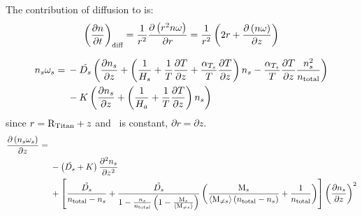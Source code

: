 The contribution of diffusion to  is:
\begin{equation}
\left(\frac{\partial n}{\partial t}\right)_{\text{diff}} = \frac{1}{r^2}\frac{\partial\left(r^2n\omega\right)}{\partial r}
                                             = \frac{1}{r^2}\left(2 r + \frac{\partial\left(n\omega\right)}{\partial z}\right)
\label{Titan:diffusion}
\end{equation}

\begin{equation}
\begin{split}
n_s\omega_s = &\: -\tilde{D_s} 
                        \left(\frac{\partial n_s}{\partial z} + \left(\frac{1}{H_s} + 
                                \frac{1}{T}\frac{\partial T}{\partial z} + \frac{\alpha_{T_s}}{T}\frac{\partial T}{\partial z}\right)n_s
                                - \frac{\alpha_{T_s}}{T}\frac{\partial T}{\partial z}\frac{n_s^2}{n_\text{total}}\right) \\
                  &\: - K \left(\frac{\partial n_s}{\partial z} + \left(\frac{1}{H_a} + \frac{1}{T}\frac{\partial T}{\partial z}\right)n_s\right)
\end{split}
\end{equation}
since $r = \text{R}_\text{Titan} + z$ and \RTitan\ is constant, $\partial r = \partial z$.
\begin{equation}
\begin{split}
\frac{\partial\left(n_s\omega_s\right)}{\partial z} = &\; \\
        &\; - \left(\tilde{D_s} + K\right) \frac{\partial^2n_s}{\partial{z}^2} \\
        &\; + \left[\frac{\tilde{D_s}}{n_\text{total} - n_s}
         + \frac{\tilde{D_s}}{1-\frac{n_s}{n_\text{total}}\left(1 - \frac{\text{M}_s}{\langle\text{M}_{\neq s}\rangle}\right)}
                  \left( \frac{\text{M}_s}{\langle\text{M}_{\neq s}\rangle\left(n_\text{total} - n_s\right)} + \frac{1}{n_\text{total}}\right)\right]
             \left(\frac{\partial n_s}{\partial z}\right)^2\\
\end{split}
\end{equation}
